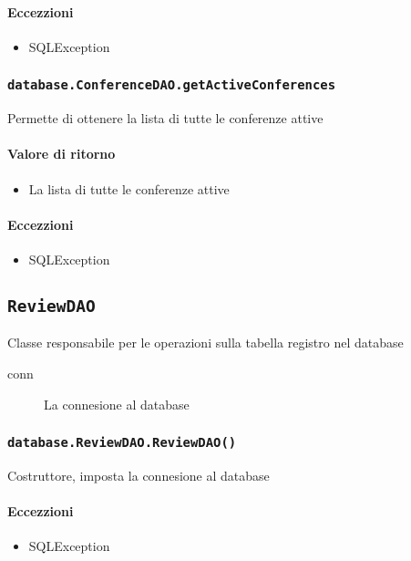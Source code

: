 \paragraph{Eccezzioni}
\begin{itemize}
  \item SQLException
\end{itemize}

\subsubsection{\texttt{database.ConferenceDAO.getActiveConferences}}
Permette di ottenere la lista di tutte le conferenze attive
\paragraph{Valore di ritorno}
\begin{itemize}
\item La lista di tutte le conferenze attive
\end{itemize}
\paragraph{Eccezzioni}
\begin{itemize}
  \item SQLException
\end{itemize}


\subsection{\texttt{ReviewDAO}}
Classe responsabile per le operazioni sulla tabella registro nel database
\begin{description}
\item[conn] La connesione al database
\end{description}

\subsubsection{\texttt{database.ReviewDAO.ReviewDAO()}}
Costruttore, imposta la connesione al database
\paragraph{Eccezzioni}
\begin{itemize}
  \item SQLException
\end{itemize}


